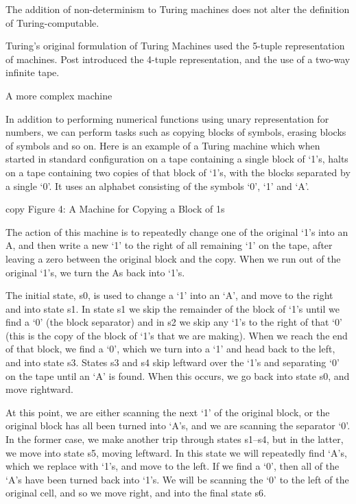 The addition of non-determinism to Turing machines does not alter the definition of Turing-computable.

Turing's original formulation of Turing Machines used the 5-tuple representation of machines. Post introduced the 4-tuple representation, and the use of a two-way infinite tape.

A more complex machine

In addition to performing numerical functions using unary representation for numbers, we can perform tasks such as copying blocks of symbols, erasing blocks of symbols and so on. Here is an example of a Turing machine which when started in standard configuration on a tape containing a single block of ‘1’s, halts on a tape containing two copies of that block of ‘1’s, with the blocks separated by a single ‘0’. It uses an alphabet consisting of the symbols ‘0’, ‘1’ and ‘A’.

copy 
Figure 4: A Machine for Copying a Block of 1s

The action of this machine is to repeatedly change one of the original ‘1’s into an A, and then write a new ‘1’ to the right of all remaining ‘1’ on the tape, after leaving a zero between the original block and the copy. When we run out of the original ‘1’s, we turn the As back into ‘1’s.

The initial state, s0, is used to change a ‘1’ into an ‘A’, and move to the right and into state s1. In state s1 we skip the remainder of the block of ‘1’s until we find a ‘0’ (the block separator) and in s2 we skip any ‘1’s to the right of that ‘0’ (this is the copy of the block of ‘1’s that we are making). When we reach the end of that block, we find a ‘0’, which we turn into a ‘1’ and head back to the left, and into state s3. States s3 and s4 skip leftward over the ‘1’s and separating ‘0’ on the tape until an ‘A’ is found. When this occurs, we go back into state s0, and move rightward.

At this point, we are either scanning the next ‘1’ of the original block, or the original block has all been turned into ‘A's, and we are scanning the separator ‘0’. In the former case, we make another trip through states s1–s4, but in the latter, we move into state s5, moving leftward. In this state we will repeatedly find ‘A's, which we replace with ‘1’s, and move to the left. If we find a ‘0’, then all of the ‘A's have been turned back into ‘1’s. We will be scanning the ‘0’ to the left of the original cell, and so we move right, and into the final state s6.

